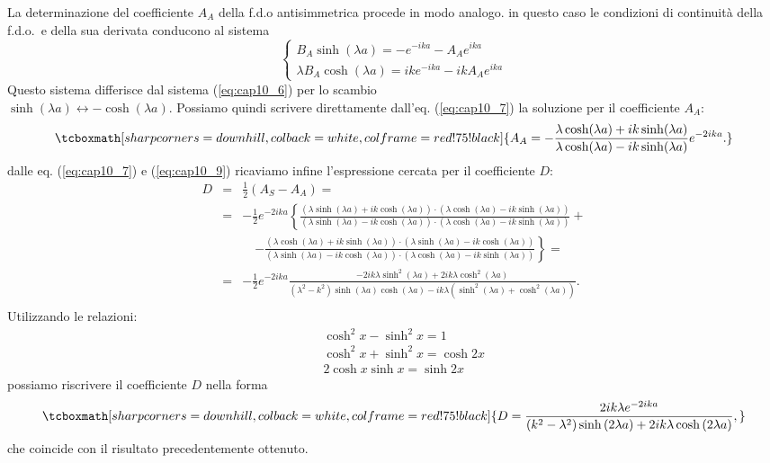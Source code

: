 La determinazione del coefficiente $A_A$ della f.d.o antisimmetrica procede in modo analogo. in questo caso le condizioni di continuità della f.d.o.~e della sua derivata conducono al sistema
	\begin{equation}
		\begin{cases}
		\displaystyle{B_A \sinh (\lambda a) = -e^{-ika}- A_A e^{ika}}\\
		\displaystyle{\lambda B_A \cosh (\lambda a) = ik e^{-ika}- ikA_A e^{ika}}
		\end{cases}
	\label{eq:cap10_8}
	\end{equation}
Questo sistema differisce dal sistema (\ref{eq:cap10_6}) per lo scambio\\ $\sinh (\lambda a) \leftrightarrow -\cosh (\lambda a)$. Possiamo quindi scrivere direttamente dall'eq. (\ref{eq:cap10_7}) la soluzione per il coefficiente $A_A$:
	\begin{equation}
		\tcboxmath[sharp corners=downhill, colback=white, colframe=red!75!black]{
			A_A=-\frac{\lambda \cosh (\lambda a)+ik \sinh (\lambda a)}{\lambda \cosh (\lambda a)-ik \sinh (\lambda a)}e^{-2ika}.
			}
	\label{eq:cap10_9}
	\end{equation}
dalle eq. (\ref{eq:cap10_7}) e (\ref{eq:cap10_9}) ricaviamo infine l'espressione cercata per il coefficiente $D$:
	\begin{eqnarray}
		D&=&\frac{1}{2}\left( A_S - A_A \right)= \nonumber \\
		&=& -\frac{1}{2}e^{-2ika}\left\lbrace \frac{\left( \lambda \sinh (\lambda a)+ ik \cosh (\lambda a )\right)\cdot\left( \lambda \cosh (\lambda a)- ik \sinh (\lambda a )\right)}{\left( \lambda\sinh ( \lambda a )-ik \cosh (\lambda a )\right)\cdot\left(\lambda \cosh ( \lambda a )-ik \sinh (\lambda a )\right)}\right. +\nonumber \\
		& &\quad \left. -\frac{\left( \lambda \cosh (\lambda a)+ ik \sinh (\lambda a )\right)\cdot \left( \lambda \sinh (\lambda a)- ik \cosh (\lambda a )\right)}{(\lambda \sinh (\lambda a)- ik\cosh (\lambda a )) \cdot (\lambda \cosh (\lambda a ) - ik \sinh (\lambda a ))}\right\rbrace= \nonumber \\
		&=& -\frac{1}{2}e^{-2ika} \frac{-2ik\lambda \sinh ^2 (\lambda a) + 2ik \lambda \cosh ^2 (\lambda a)}{ \left(\lambda ^2 - k^2 \right) \sinh (\lambda a ) \cosh (\lambda a) - ik\lambda \left(\sinh ^2 (\lambda a) + \cosh ^2 (\lambda a ) \right)}.\nonumber \\
	\end{eqnarray}
Utilizzando le relazioni:
	\begin{eqnarray}
		& &\cosh ^2 x - \sinh ^2 x=1 \nonumber \\
		& &\cosh ^2 x + \sinh ^2 x=\cosh 2x  \\
		& &2 \cosh  x \sinh  x=\sinh 2x \nonumber 
	\end{eqnarray}
possiamo riscrivere il coefficiente $D$ nella forma
	\begin{equation}
		\tcboxmath[sharp corners=downhill, colback=white, colframe=red!75!black]{	
			D=\frac{2ik\lambda e^{-2ika}}{\left(k^2-\lambda^2\right)\sinh \left(2\lambda a\right)+2ik\lambda \cosh\left(2\lambda a\right)},
			}
	\end{equation}
che coincide con il risultato precedentemente ottenuto.
